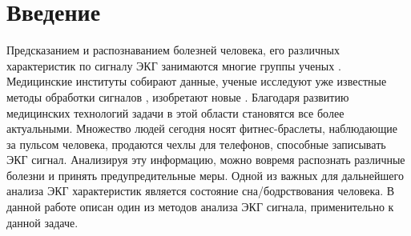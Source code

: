 \chapter{Введение}

Предсказанием и распознаванием болезней человека, его различных характеристик по сигналу ЭКГ занимаются многие группы ученых \cite{all1, all2}. Медицинские институты собирают данные, ученые исследуют уже известные методы обработки сигналов \cite{article_for_features}, изобретают новые \cite{modern_research}. Благодаря развитию медицинских технологий задачи в этой области становятся все более актуальными. Множество людей сегодня носят фитнес-браслеты, наблюдающие за пульсом человека, продаются чехлы для телефонов, способные записывать ЭКГ сигнал.
Анализируя эту информацию, можно вовремя распознать различные болезни и принять предупредительные меры. Одной из важных для дальнейшего анализа ЭКГ характеристик является состояние сна/бодрствования человека. В данной работе описан один из методов анализа ЭКГ сигнала, применительно к данной задаче.
